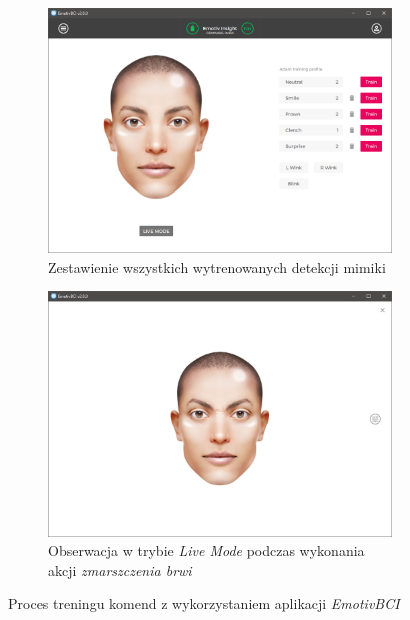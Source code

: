 \documentclass[skorowidz,skroty]{dyplomWEZUT}
\begin{document}
\begin{figure}
    \begin{subfigure}[b]{0.475\textwidth}   
        \centering 
        \includegraphics[width=\textwidth, keepaspectratio]{graphic/facial_all}
        \caption{Zestawienie wszystkich wytrenowanych detekcji mimiki\label{fig:training_facial_all}}  
    \end{subfigure}
    \quad
    \begin{subfigure}[b]{0.475\textwidth}   
        \centering 
        \includegraphics[width=\textwidth, keepaspectratio]{graphic/facial_frown}
        \caption{Obserwacja w trybie \textit{Live Mode} podczas wykonania akcji \textit{zmarszczenia brwi}\label{fig:training_facial_frown}}   
    \end{subfigure}
    \caption{Proces treningu komend z wykorzystaniem aplikacji \textit{EmotivBCI}\label{fig:training}}
\end{figure}
\end{document}
